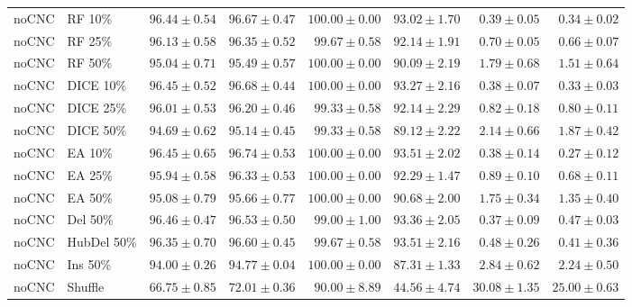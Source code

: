 {\begin{longtable}{llrrrrrr}
noCNC & RF 10\% & $96.44\pm0.54$ & $96.67\pm0.47$ & $100.00\pm0.00$ & $93.02\pm1.70$ & $0.39\pm0.05$ & $0.34\pm0.02$ \\
noCNC & RF 25\% & $96.13\pm0.58$ & $96.35\pm0.52$ & $99.67\pm0.58$ & $92.14\pm1.91$ & $0.70\pm0.05$ & $0.66\pm0.07$ \\
noCNC & RF 50\% & $95.04\pm0.71$ & $95.49\pm0.57$ & $100.00\pm0.00$ & $90.09\pm2.19$ & $1.79\pm0.68$ & $1.51\pm0.64$ \\
noCNC & DICE 10\% & $96.45\pm0.52$ & $96.68\pm0.44$ & $100.00\pm0.00$ & $93.27\pm2.16$ & $0.38\pm0.07$ & $0.33\pm0.03$ \\
noCNC & DICE 25\% & $96.01\pm0.53$ & $96.20\pm0.46$ & $99.33\pm0.58$ & $92.14\pm2.29$ & $0.82\pm0.18$ & $0.80\pm0.11$ \\
noCNC & DICE 50\% & $94.69\pm0.62$ & $95.14\pm0.45$ & $99.33\pm0.58$ & $89.12\pm2.22$ & $2.14\pm0.66$ & $1.87\pm0.42$ \\
noCNC & EA 10\% & $96.45\pm0.65$ & $96.74\pm0.53$ & $100.00\pm0.00$ & $93.51\pm2.02$ & $0.38\pm0.14$ & $0.27\pm0.12$ \\
noCNC & EA 25\% & $95.94\pm0.58$ & $96.33\pm0.53$ & $100.00\pm0.00$ & $92.29\pm1.47$ & $0.89\pm0.10$ & $0.68\pm0.11$ \\
noCNC & EA 50\% & $95.08\pm0.79$ & $95.66\pm0.77$ & $100.00\pm0.00$ & $90.68\pm2.00$ & $1.75\pm0.34$ & $1.35\pm0.40$ \\
noCNC & Del 50\% & $96.46\pm0.47$ & $96.53\pm0.50$ & $99.00\pm1.00$ & $93.36\pm2.05$ & $0.37\pm0.09$ & $0.47\pm0.03$ \\
noCNC & HubDel 50\% & $96.35\pm0.70$ & $96.60\pm0.45$ & $99.67\pm0.58$ & $93.51\pm2.16$ & $0.48\pm0.26$ & $0.41\pm0.36$ \\
noCNC & Ins 50\% & $94.00\pm0.26$ & $94.77\pm0.04$ & $100.00\pm0.00$ & $87.31\pm1.33$ & $2.84\pm0.62$ & $2.24\pm0.50$ \\
noCNC & Shuffle & $66.75\pm0.85$ & $72.01\pm0.36$ & $90.00\pm8.89$ & $44.56\pm4.74$ & $30.08\pm1.35$ & $25.00\pm0.63$ \\
\end{longtable}
}

